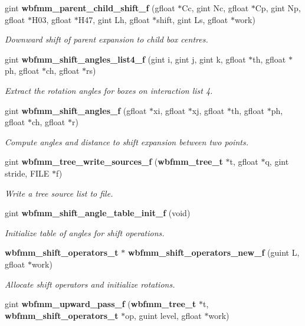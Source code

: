 \begin{DoxyCompactItemize}
gint {\bf wbfmm\+\_\+parent\+\_\+child\+\_\+shift\+\_\+f} (gfloat $\ast$Cc, gint Nc, gfloat $\ast$Cp, gint Np, gfloat $\ast$H03, gfloat $\ast$H47, gint Lh, gfloat $\ast$shift, gint Ls, gfloat $\ast$work)
\begin{DoxyCompactList}\small\item\em Downward shift of parent expansion to child box centres. \end{DoxyCompactList}\item 
gint {\bf wbfmm\+\_\+shift\+\_\+angles\+\_\+list4\+\_\+f} (gint i, gint j, gint k, gfloat $\ast$th, gfloat $\ast$ph, gfloat $\ast$ch, gfloat $\ast$rs)
\begin{DoxyCompactList}\small\item\em Extract the rotation angles for boxes on interaction list 4. \end{DoxyCompactList}\item 
gint {\bf wbfmm\+\_\+shift\+\_\+angles\+\_\+f} (gfloat $\ast$xi, gfloat $\ast$xj, gfloat $\ast$th, gfloat $\ast$ph, gfloat $\ast$ch, gfloat $\ast$r)
\begin{DoxyCompactList}\small\item\em Compute angles and distance to shift expansion between two points. \end{DoxyCompactList}\item 
gint {\bf wbfmm\+\_\+tree\+\_\+write\+\_\+sources\+\_\+f} ({\bf wbfmm\+\_\+tree\+\_\+t} $\ast$t, gfloat $\ast$q, gint stride, F\+I\+L\+E $\ast$f)
\begin{DoxyCompactList}\small\item\em Write a tree source list to file. \end{DoxyCompactList}\item 
gint {\bf wbfmm\+\_\+shift\+\_\+angle\+\_\+table\+\_\+init\+\_\+f} (void)
\begin{DoxyCompactList}\small\item\em Initialize table of angles for shift operations. \end{DoxyCompactList}\item 
{\bf wbfmm\+\_\+shift\+\_\+operators\+\_\+t} $\ast$ {\bf wbfmm\+\_\+shift\+\_\+operators\+\_\+new\+\_\+f} (guint L, gfloat $\ast$work)
\begin{DoxyCompactList}\small\item\em Allocate shift operators and initialize rotations. \end{DoxyCompactList}\item 
gint {\bf wbfmm\+\_\+upward\+\_\+pass\+\_\+f} ({\bf wbfmm\+\_\+tree\+\_\+t} $\ast$t, {\bf wbfmm\+\_\+shift\+\_\+operators\+\_\+t} $\ast$op, guint level, gfloat $\ast$work)

\end{DoxyCompactItemize}
